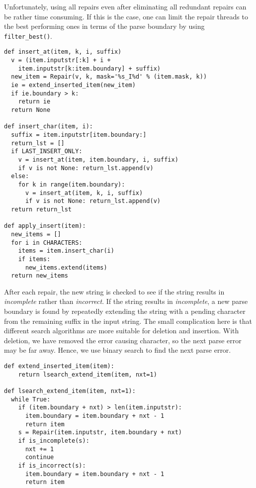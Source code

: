 \documentclass[acmsmall,screen,review,anonymous]{acmart}
\newcommand{\approach}{\textsc{$\Delta$Repair}\xspace}
\newcommand{\drepair}{\approach}
\def\<#1>{\texttt{#1}}
\begin{document}
Unfortunately, using all repairs even after eliminating all redundant repairs
can be rather time consuming. If this is the case, one can limit the repair
threads to the best performing ones in terms of the parse boundary by using
\<filter\_best()>.




\begin{lstlisting}[caption=\drepair repairs,label={lst:repairs}]
def insert_at(item, k, i, suffix)
  v = (item.inputstr[:k] + i +
    item.inputstr[k:item.boundary] + suffix)
  new_item = Repair(v, k, mask='%s_I%d' % (item.mask, k))
  ie = extend_inserted_item(new_item)
  if ie.boundary > k:
    return ie
  return None

def insert_char(item, i):
  suffix = item.inputstr[item.boundary:]
  return_lst = []
  if LAST_INSERT_ONLY:
    v = insert_at(item, item.boundary, i, suffix)
    if v is not None: return_lst.append(v)
  else:
    for k in range(item.boundary):
      v = insert_at(item, k, i, suffix)
      if v is not None: return_lst.append(v)
  return return_lst

def apply_insert(item):
  new_items = []
  for i in CHARACTERS:
    items = item.insert_char(i)
    if items:
      new_items.extend(items)
  return new_items
\end{lstlisting}
\vspace{\baselineskip}


After each repair, the new string is checked  to see if
the string results in \emph{incomplete} rather than \emph{incorrect}. If the
string results in \emph{incomplete}, a new parse boundary is found by
repeatedly extending the string with a pending character from the remaining
suffix in the input string. The small complication here is that different
search algorithms are more suitable for deletion and insertion. With deletion,
we have removed the error causing character, so the next parse error may
be far away. Hence, we use binary search to find the next parse error.%
\par
\begin{lstlisting}[caption=Code that shows linear search performed when extending after inserting a character,label={lst:extenditeminsert}]
def extend_inserted_item(item):
    return lsearch_extend_item(item, nxt=1)

def lsearch_extend_item(item, nxt=1):
  while True:
    if (item.boundary + nxt) > len(item.inputstr):
      item.boundary = item.boundary + nxt - 1
      return item
    s = Repair(item.inputstr, item.boundary + nxt)
    if is_incomplete(s):
      nxt += 1
      continue
    if is_incorrect(s):
      item.boundary = item.boundary + nxt - 1
      return item
\end{lstlisting}
\vspace{\baselineskip}
\end{document}
